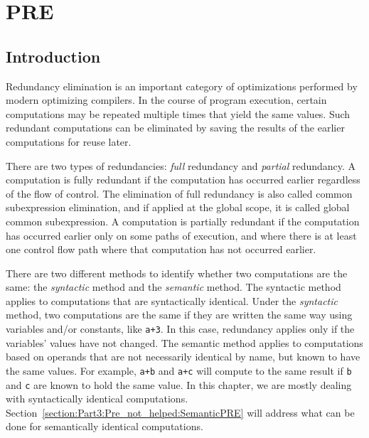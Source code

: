 \chapter{PRE }
\graphicspath{{img/}{pre_not_helped/img/}{part3/pre_not_helped/img/}}

\section{Introduction}

Redundancy elimination is an 
important category of optimizations performed by modern optimizing compilers.
In the course of program execution, certain computations may be repeated
multiple times that yield the same values.  Such redundant
computations can be eliminated by saving the results of the earlier 
computations for reuse later.  

There are two types of redundancies: \emph{full} redundancy and 
\emph{partial} redundancy.  A computation is fully redundant if the 
computation has occurred earlier regardless of the flow of control.
The elimination of full redundancy is also called common subexpression
elimination, and if applied at the global scope, it is called global common
subexpression.  A computation is partially redundant if the computation has
occurred earlier only on some paths of execution, and where there is at
least one control flow path where that computation has not occurred earlier.

There are two different methods to identify whether two computations are the 
same: the \emph{syntactic} method and the \emph{semantic} method.  The 
syntactic method applies to computations that are syntactically identical.
Under the \emph{syntactic} method, two computations are the same if they
are written the same way using variables and/or constants, like 
{\tt a+3}.  In this case,
redundancy applies only if the variables' values have not changed.
The semantic method applies to computations based on operands that are
not necessarily identical by name, but known to have the same values.
For example, {\tt a+b} and {\tt a+c} will compute to the same result
if {\tt b} and {\tt c} are known to hold the same value.
In this chapter, we are mostly dealing with syntactically identical
computations.  Section~\ref{section:Part3:Pre_not_helped:SemanticPRE} will
address what can be done for semantically identical computations. 

